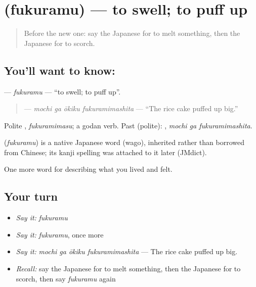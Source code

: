 \section[\texorpdfstring{\ja{ふくらむ} (fukuramu)}{ふくらむ (fukuramu)}]{ (fukuramu) — to swell; to puff up}

\label{lesson:JA-C473-fukuramu}



\begin{quote}
Before the new one: say the Japanese for to melt something, then the Japanese for to scorch.
\end{quote}

\subsection*{You'll want to know: }
\textbf{} — \emph{fukuramu} — \textquotedblleft{}to swell; to puff up\textquotedblright{}.

\begin{quote}
\textbf{  } — \emph{mochi ga ōkiku fukuramimashita} — \textquotedblleft{}The rice cake puffed up big.\textquotedblright{}
\end{quote}

Polite \textbf{}, \emph{fukuramimasu}; a godan verb. Past (polite): \textbf{ }, \emph{mochi ga fukuramimashita}.

\begin{cousinweb}
\textbf{} (\emph{fukuramu}) is a native Japanese word (wago), inherited rather than borrowed from Chinese; its kanji spelling was attached to it later (JMdict).
\end{cousinweb}

\begin{grammarlens}[title={What you've built}]
One more word for describing what you lived and felt.
\end{grammarlens}

\subsection*{Your turn}
\begin{itemize}
\raggedright
  \item \emph{Say it:} \emph{fukuramu}
  \item \emph{Say it:} \emph{fukuramu}, once more
  \item \emph{Say it:} \emph{mochi ga ōkiku fukuramimashita} — The rice cake puffed up big.
  \item \emph{Recall:} say the Japanese for to melt something, then the Japanese for to scorch, then say \emph{fukuramu} again
\end{itemize}

